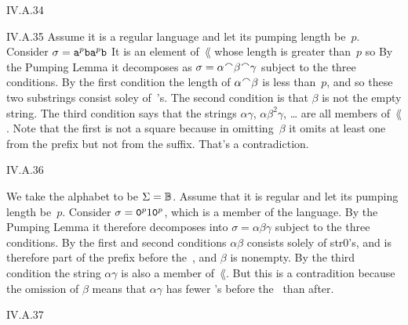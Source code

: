 %
\begin{ans}{IV.A.34}
\end{ans}
%
\begin{ans}{IV.A.35}
Assume it is a regular language and let its pumping length be~$p$.
Consider $\sigma=\texttt{a}^p\texttt{b}\texttt{a}^p\texttt{b}$
It is an element of~$\lang$ whose length is greater than~$p$ so
By the Pumping Lemma it decomposes as $\sigma=\alpha\concat\beta\concat\gamma$
subject to the three conditions.
By the first condition the length of $\alpha\concat\beta$ is less than~$p$,
and so these two substrings consist soley of~'s.
The second condition is that $\beta$ is not the empty string.
The third condition says that the strings
$\alpha\gamma$, $\alpha\beta^2\gamma$, \ldots{} are all members of~$\lang$.
Note that the first is not a square because in omitting~$\beta$ it omits at
least one~ from the prefix but not from the suffix.
That's a contradiction.
\end{ans}
%
\begin{ans}{IV.A.36}
\begin{exparts}
\item We take the alphabet to be $\Sigma=\mathbb{B}$.
Assume that it is regular and let its pumping length be~$p$.
Consider $\sigma=\texttt{0}^p1\texttt{0}^p$, which is a member of the language.
By the Pumping Lemma it therefore decomposes into $\sigma=\alpha\beta\gamma$
subject to the three conditions.
By the first and second conditions $\alpha\beta$ consists solely of
str{0}'s, and is therefore part of the prefix before the~,
and $\beta$ is nonempty.
By the third condition the string $\alpha\gamma$ is also a member of~$\lang$.
But this is a contradition because the omission of $\beta$ means
that $\alpha\gamma$ has fewer 's before the~ than after.
\item {}
\end{exparts}
\end{ans}
%
\begin{ans}{IV.A.37}
\begin{exparts}
\item {}
\item {}
\item {}
\end{exparts}
\end{ans}
